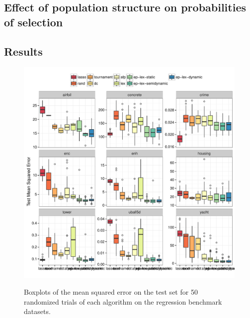 \documentclass[preprint]{article}
\begin{document}
\subsection{Effect of population structure on probabilities of selection}


\subsection{Results}\label{s:4 results}
\begin{figure}
\centering
  \includegraphics[width=\textwidth]{figs/regression_boxplots.pdf}\\
  \caption{Boxplots of the mean squared error on the test set for 50 randomized trials of each algorithm on the regression benchmark datasets.}\label{fig:boxplot_reg}
\end{figure}
\end{document}
